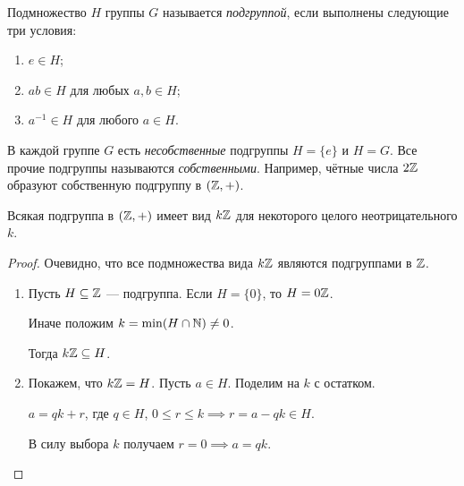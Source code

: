 \begin{definition}
    Подмножество $H$ группы $G$ называется \textit{подгруппой}, если выполнены следующие три условия:
    \begin{enumerate}[nosep]
    \item $e \in H$;
    \item $ab \in H$ для любых $a, b \in H$;
    \item $a^{-1} \in H$ для любого $a \in H$.
    \end{enumerate}
\end{definition}

В каждой группе $G$ есть \textit{несобственные} подгруппы $H = \{e\}$ и $H = G$. Все прочие подгруппы называются \textit{собственными}. Например, чётные числа $2\mathbb{Z}$ образуют собственную подгруппу в $(\mathbb{Z}, +)$.

\begin{proposal}
    Всякая подгруппа в $(\mathbb{Z}, +)$ имеет вид $k\mathbb{Z}$ для некоторого целого неотрицательного $k$.
\end{proposal}

\begin{proof}
    Очевидно, что все подмножества вида $k\mathbb{Z}$ являются подгруппами в $\mathbb{Z}$.
    \begin{enumerate}
    \item Пусть $H \subseteq \mathbb{Z}$ --- подгруппа. Если $H = \{0\}$, то $H = 0\mathbb{Z}$.
    
        Иначе положим $k = \min(H \cap \mathbb{N}) \neq 0$.

        Тогда $k\mathbb{Z} \subseteq H$.

    \item
        Покажем, что $k\mathbb{Z} = H$. Пусть $a \in H$. Поделим на $k$ с остатком.

        $a = qk + r$, где $q \in H$, $0 \leq r \leq k \implies r = a - qk \in H$.

        В силу выбора $k$ получаем $r = 0 \implies a = qk$.
        \qedhere
    \end{enumerate}
\end{proof}
